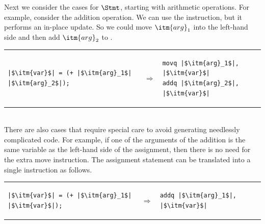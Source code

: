 \documentclass[11pt]{book}
\begin{document}
Next we consider the cases for $\Stmt$, starting with arithmetic
operations. For example, consider the addition operation. We can use
the  instruction, but it performs an in-place update.  So we
could move $\itm{arg}_1$ into the left-hand side  and then
add $\itm{arg}_2$ to . \\
\begin{tabular}{lll}
\begin{minipage}{0.4\textwidth}
\begin{lstlisting}
|$\itm{var}$| = (+ |$\itm{arg}_1$| |$\itm{arg}_2$|);
\end{lstlisting}
\end{minipage}
&
$\Rightarrow$
&
\begin{minipage}{0.4\textwidth}
\begin{lstlisting}
movq |$\itm{arg}_1$|, |$\itm{var}$|
addq |$\itm{arg}_2$|, |$\itm{var}$|
\end{lstlisting}
\end{minipage}
\end{tabular} \\
%
There are also cases that require special care to avoid generating
needlessly complicated code. For example, if one of the arguments of
the addition is the same variable as the left-hand side of the
assignment, then there is no need for the extra move instruction.  The
assignment statement can be translated into a single 
instruction as follows.\\
\begin{tabular}{lll}
\begin{minipage}{0.4\textwidth}
\begin{lstlisting}
|$\itm{var}$| = (+ |$\itm{arg}_1$| |$\itm{var}$|);
\end{lstlisting}
\end{minipage}
&
$\Rightarrow$
&
\begin{minipage}{0.4\textwidth}
\begin{lstlisting}
addq |$\itm{arg}_1$|, |$\itm{var}$|
\end{lstlisting}
\end{minipage}
\end{tabular}
\end{document}
